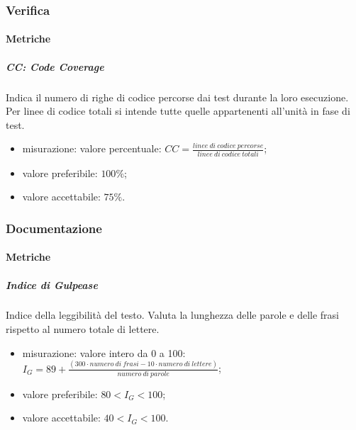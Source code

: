 	\subsubsection{Verifica}
		\paragraph{Metriche}
			\subparagraph{CC: Code Coverage}
				Indica il numero di righe di codice percorse dai test durante la loro esecuzione. Per linee di codice totali si intende tutte quelle appartenenti all'unità in fase di test.
				\begin{itemize}
					\item misurazione: valore percentuale: $CC = \frac{linee\ di\ codice\ percorse}{linee\ di\ codice\ totali}$;
					\item valore preferibile: $100\%$;
					\item valore accettabile: $75\%$.
				\end{itemize}
	\subsubsection{Documentazione}
		\paragraph{Metriche}
			\subparagraph{Indice di Gulpease}
			Indice della leggibilità del testo. Valuta la lunghezza delle parole e delle frasi rispetto al numero totale di lettere. 
			\begin{itemize}
				\item misurazione: valore intero da 0 a 100:\newline 	
				$I_G = 89+ \frac{(300 \cdot numero\ di\ frasi - 10 \cdot numero\ di\ lettere)}{numero\ di\ parole}$;	
				\item valore preferibile: $80 < I_G < 100$;
				\item valore accettabile: $40 < I_G < 100$.
			\end{itemize}


